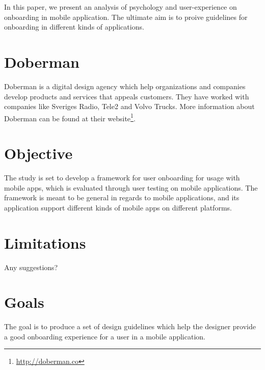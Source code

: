 In this paper, we present an analysis of psychology and user-experience on onboarding in mobile application. The ultimate aim is to proive guidelines for onboarding in different kinds of applications.

\section{Doberman}
Doberman is a digital design agency which help organizations and companies develop products and services that appeals customers. They have worked with companies like Sveriges Radio, Tele2 and Volvo Trucks. More information about Doberman can be found at their website\footnote{\url{http://doberman.co}}.

\section{Objective}
The study is set to develop a framework for user onboarding for usage with mobile apps, which is evaluated through user testing on mobile applications. The framework is meant to be general in regards to mobile applications, and its application support different kinds of mobile apps on different platforms.

\section{Limitations}
Any suggestions?

\section{Goals}
The goal is to produce a set of design guidelines which help the designer provide a good onboarding experience for a user in a mobile application.
